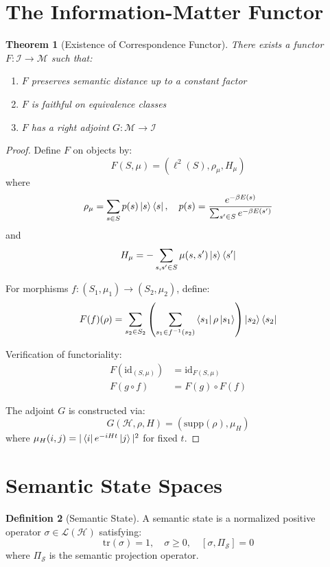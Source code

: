 \documentclass[12pt,a4paper]{article}
\theoremstyle{plain}
\newtheorem{theorem}{Theorem}[section]
\theoremstyle{definition}
\newtheorem{definition}[theorem]{Definition}
\newcommand{\Hil}{\mathcal{H}}
\newcommand{\Info}{\mathcal{I}}
\newcommand{\Matter}{\mathcal{M}}
\newcommand{\Sem}{\mathcal{S}}
\newcommand{\id}{\mathrm{id}}
\newcommand{\tr}{\mathrm{tr}}
\newcommand{\supp}{\mathrm{supp}}
\begin{document}
\section{The Information-Matter Functor}

\begin{theorem}[Existence of Correspondence Functor]
There exists a functor $F: \Info \to \Matter$ such that:
\begin{enumerate}
\item $F$ preserves semantic distance up to a constant factor
\item $F$ is faithful on equivalence classes
\item $F$ has a right adjoint $G: \Matter \to \Info$
\end{enumerate}
\end{theorem}

\begin{proof}
Define $F$ on objects by:
\[
F(S, \mu) = \left(\ell^2(S), \rho_\mu, H_\mu\right)
\]
where
\[
\rho_\mu = \sum_{s \in S} p(s) \ket{s}\bra{s}, \quad p(s) = \frac{e^{-\beta E(s)}}{\sum_{s' \in S} e^{-\beta E(s')}}
\]
and
\[
H_\mu = -\sum_{s, s' \in S} \mu(s, s') \ket{s}\bra{s'}
\]

For morphisms $f: (S_1, \mu_1) \to (S_2, \mu_2)$, define:
\[
F(f)(\rho) = \sum_{s_2 \in S_2} \left(\sum_{s_1 \in f^{-1}(s_2)} \bra{s_1}\rho\ket{s_1}\right) \ket{s_2}\bra{s_2}
\]

Verification of functoriality:
\begin{align}
F(\id_{(S,\mu)}) &= \id_{F(S,\mu)} \\
F(g \circ f) &= F(g) \circ F(f)
\end{align}

The adjoint $G$ is constructed via:
\[
G(\Hil, \rho, H) = (\supp(\rho), \mu_H)
\]
where $\mu_H(i, j) = |\bra{i}e^{-iHt}\ket{j}|^2$ for fixed $t$.
\end{proof}

\section{Semantic State Spaces}

\begin{definition}[Semantic State]
A semantic state is a normalized positive operator $\sigma \in \mathcal{L}(\Hil)$ satisfying:
\[
\tr(\sigma) = 1, \quad \sigma \geq 0, \quad [\sigma, \Pi_{\Sem}] = 0
\]
where $\Pi_{\Sem}$ is the semantic projection operator.
\end{definition}
\end{document}
